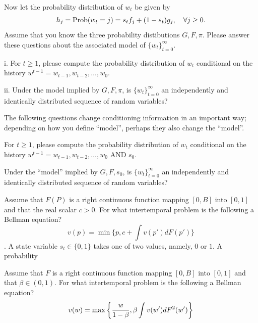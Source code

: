 \medskip
{} Now let  the probability distribution of $w_t$  be given by
$$ h_j = {\rm Prob}(w_t = j) = s_t f_j + (1-s_t) g_j ,  \quad \forall j \geq 0. $$
Assume that you know the three probability distibutions $G, F, \pi$.
Please answer these questions about the associated   model of  $\{w_t\}_{t=0}^\infty$.


\smallskip
\item{i.}  For $t \geq 1$, 
please compute the probability distribution of  $w_t$ conditional on the history $w^{t-1} = w_{t-1}, w_{t-2}, \ldots, w_0$. 


\item{ii.} Under the model implied by $G, F, \pi$, is $\{w_t\}_{t=0}^\infty$ an independently and identically distributed sequence of random variables?




\noindent The following questions change conditioning information in an important way; depending on how you define ``model'', perhaps they also change the ``model''.  


\medskip
{} For $t \geq 1$, 
please compute the probability distribution of  $w_t$ conditional on  the history $w^{t-1} = w_{t-1}, w_{t-2}, \ldots, w_0$ AND $s_0$. 

\medskip 
{} Under the ``model'' implied by $G, F, s_0$, is $\{w_t\}_{t=0}^\infty$ an independently and identically distributed sequence of random variables?




 












\bye



\medskip


\medskip
Assume that  $F(P)$ is a right continuous function mapping $[0, B]$ into $[0,1]$ and that the real scalar $c > 0$.  For what intertemporal problem is the following
a Bellman equation?
$$ v(p) = \min \{p, c + \int v(p') d F(p') \}$$.  A state variable $s_t \in \{0,1\}$ takes one of two values, namely, $0$ or $1$.  A probability


\medskip



  Assume that  $F$ is a right continuous function mapping $[0, B]$ into $[0,1]$ and that $\beta \in (0,1)$. For what intertemporal problem is the following a Bellman equation?
$$ v(w) = \max\left\{ {w\over{1-\beta}},  \beta \int v(w') d F^2(w') \right\} $$



